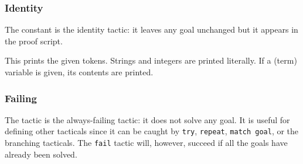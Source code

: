 \ErrMsg {}

\subsubsection[Identity]{Identity\label{ltac:idtac}
}

The constant {} is the identity tactic: it leaves any goal
unchanged but it appears in the proof script.


This prints the given tokens. Strings and integers are printed
literally. If a (term) variable is given, its contents are printed.


\subsubsection[Failing]{Failing
}

The tactic {} is the always-failing tactic: it does not solve
any goal. It is useful for defining other tacticals since it can be
caught by {\tt try}, {\tt repeat}, {\tt match goal}, or the branching
tacticals. The {\tt fail} tactic will, however, succeed if all the
goals have already been solved.

